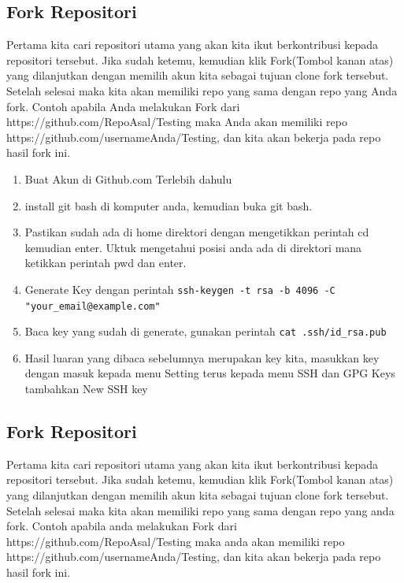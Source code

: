 \subsection{Fork Repositori}
Pertama kita cari repositori utama yang akan kita ikut berkontribusi kepada repositori tersebut. Jika sudah ketemu, kemudian klik Fork(Tombol kanan atas) yang dilanjutkan dengan memilih akun kita sebagai tujuan clone fork tersebut. Setelah selesai maka kita akan memiliki repo yang sama dengan repo yang Anda fork. Contoh apabila Anda melakukan Fork dari https://github.com/RepoAsal/Testing maka Anda akan memiliki repo https://github.com/usernameAnda/Testing, dan kita akan bekerja pada repo hasil fork ini. 
\begin{enumerate}
\item Buat Akun di Github.com Terlebih dahulu
\item install git bash di komputer anda, kemudian buka git bash.
\item Pastikan sudah ada di home direktori dengan mengetikkan perintah cd kemudian enter. Uktuk mengetahui posisi anda ada di direktori mana ketikkan perintah pwd dan enter.
\item Generate Key dengan perintah
\verb|ssh-keygen -t rsa -b 4096 -C "your_email@example.com"|
\item Baca key yang sudah di generate, gunakan perintah
\verb|cat .ssh/id_rsa.pub|
\item Hasil luaran yang dibaca sebelumnya merupakan key kita, masukkan key dengan masuk kepada menu Setting terus kepada menu SSH dan GPG Keys tambahkan New SSH key
\end{enumerate}

\subsection{Fork Repositori}
Pertama kita cari repositori utama yang akan kita ikut berkontribusi kepada repositori tersebut. Jika sudah ketemu, kemudian klik Fork(Tombol kanan atas) yang dilanjutkan dengan memilih akun kita sebagai tujuan clone fork tersebut. Setelah selesai maka kita akan memiliki repo yang sama dengan repo yang anda fork. Contoh apabila anda melakukan Fork dari https://github.com/RepoAsal/Testing maka anda akan memiliki repo https://github.com/usernameAnda/Testing, dan kita akan bekerja pada repo hasil fork ini.


